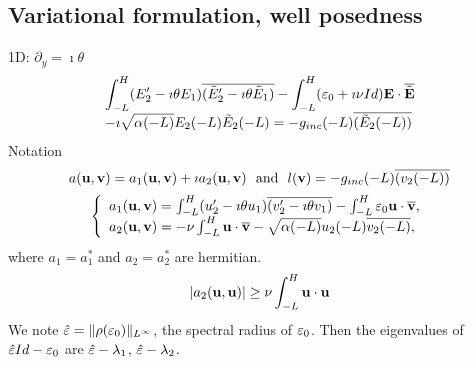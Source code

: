 \documentclass{article}
\newcommand{\be}{\begin{equation}}
\newcommand{\ee}{\end{equation}}
\newcommand{\E}{{\bf E}}
\newcommand{\ubf}{{\bf u}}
\newcommand{\vbf}{{\bf v}}
\newcommand{\eps}{{\bf \varepsilon}}
\newcommand{\heps}{{\hat{\eps}}}
\begin{document}
\subsection{Variational formulation, well posedness}
1D: $\partial_y = \imath \theta$
\be
\begin{array}{l}
\displaystyle \int_{-L}^H (E_2' -\imath\theta E_1)\overline{(\tilde E_2' -\imath \theta \tilde E_1)} - \int_{-L}^H (\eps_0 +\imath\nu Id) \E \cdot \overline{\tilde \E}
\\ \displaystyle  - \imath \sqrt{\alpha(-L)} E_2 (-L) \tilde E_2 (-L) = -g_{inc} (-L) \overline{( \tilde E_2(-L) )} 
\end{array}
\ee
Notation
\be
a(\ubf,\vbf) = a_1 (\ubf,\vbf) +\imath a_2(\ubf,\vbf)\  \text{ and } \  l(\vbf) = -g_{inc} (-L) \overline{(v_2(-L) )} 
\ee
\be
\left\{\begin{array}{l}
a_1(\ubf,\vbf) = \int_{-L}^H (u_2' -\imath\theta u_1)\overline{(v_2' -\imath \theta v_1)} - \int_{-L}^H \eps_0 \ubf\cdot \overline{\vbf}, 
\\ a_2(\ubf,\vbf) = -\nu \int_{-L}^H  \ubf\cdot \overline{\vbf} -  \sqrt{\alpha(-L)} u_2 (-L) \overline{v_2 (-L)} , 
\end{array}\right.
\ee
where $a_1= a_1^*$ and $a_2=a_2^*$ are hermitian.
\be
|a_2 (\ubf ,\ubf)| \geq \nu \int_{-L}^H \ubf\cdot \ubf
\ee
We note $\heps =  \|\rho(\eps_0)\|_{L^\infty}$, the spectral radius of $\eps_0$. Then the eigenvalues of $\heps Id- \eps_0$ are $\heps - \lambda_1$, $\heps - \lambda_2$.
\end{document}
